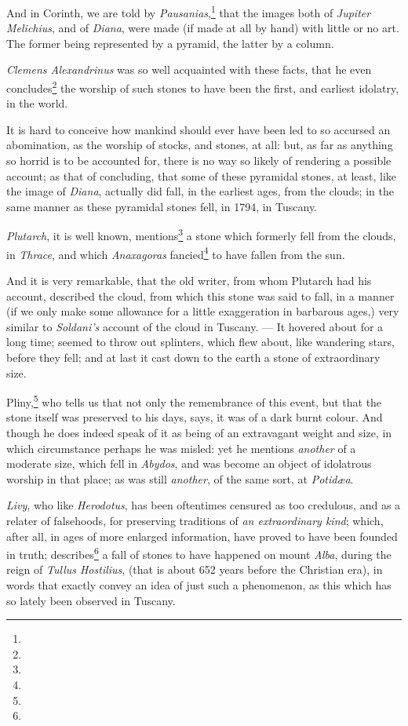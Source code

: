 \documentclass[a4paper, 12pt, oneside]{article}
\begin{document}
And in Corinth, we are told by \emph{Pausanias},\footnote{} that the images both of \emph{Jupiter Melichius}, and of \emph{Diana}, were made (if made at all by hand) with little or no art. The former being represented by a pyramid, the latter by a column.

\emph{Clemens Alexandrinus} was so well acquainted with these facts, that he even concludes\footnote{} the worship of such stones to have been the first, and earliest idolatry, in the world.

It is hard to conceive how mankind should ever have been led to so accursed an abomination, as the worship of stocks, and stones, at all: but, as far as anything so horrid is to be accounted for, there is no way so likely of rendering a possible account; as that of concluding, that some of these pyramidal stones, at least, like the image of \emph{Diana}, actually did fall, in the earliest ages, from the clouds; in the same manner as these pyramidal stones fell, in 1794, in Tuscany.

\emph{Plutarch}, it is well known, mentions\footnote{} a stone which formerly fell from the clouds, in \emph{Thrace}, and which \emph{Anaxagoras} fancied\footnote{} to have fallen from the sun.

And it is very remarkable, that the old writer, from whom Plutarch had his account, described the cloud, from which this stone was said to fall, in a manner (if we only make some allowance for a little exaggeration in barbarous ages,) very similar to \emph{Soldani's} account of the cloud in Tuscany. --- It hovered about for a long time; seemed to throw out splinters, which flew about, like wandering stars, before they fell; and at last it cast down to the earth a stone of extraordinary size.

Pliny,\footnote{} who tells us that not only the remembrance of this event, but that the stone itself was preserved to his days, says, it was of a dark burnt colour. And though he does indeed speak of it as being of an extravagant weight and size, in which circumstance perhaps he was misled: yet he mentions \emph{another} of a moderate size, which fell in \emph{Abydos}, and was become an object of idolatrous worship in that place; as was still \emph{another}, of the same sort, at \emph{Potidæa}.

\emph{Livy}, who like \emph{Herodotus}, has been oftentimes censured as too credulous, and as a relater of falsehoods, for preserving traditions of \emph{an extraordinary kind}; which, after all, in ages of more enlarged information, have proved to have been founded in truth; describes\footnote{} a fall of stones to have happened on mount \emph{Alba}, during the reign of \emph{Tullus Hostilius}, (that is about 652 years before the Christian era), in words that exactly convey an idea of just such a phenomenon, as this which has so lately been observed in Tuscany.
\end{document}

